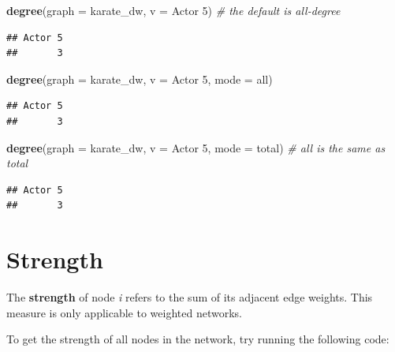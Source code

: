 \documentclass[
]{book}
\newenvironment{Shaded}{\begin{snugshade}}{\end{snugshade}}
\newcommand{\AttributeTok}[1]{\textcolor[rgb]{0.13,0.29,0.53}{#1}}
\newcommand{\CommentTok}[1]{\textcolor[rgb]{0.56,0.35,0.01}{\textit{#1}}}
\newcommand{\FunctionTok}[1]{\textcolor[rgb]{0.13,0.29,0.53}{\textbf{#1}}}
\newcommand{\NormalTok}[1]{#1}
\newcommand{\StringTok}[1]{\textcolor[rgb]{0.31,0.60,0.02}{#1}}
\begin{document}
\begin{Shaded}
\begin{Highlighting}[]
\FunctionTok{degree}\NormalTok{(}\AttributeTok{graph =}\NormalTok{ karate\_dw, }\AttributeTok{v =} \StringTok{\textquotesingle{}Actor 5\textquotesingle{}}\NormalTok{) }\CommentTok{\# the default is all{-}degree}
\end{Highlighting}
\end{Shaded}

\begin{verbatim}
## Actor 5 
##       3
\end{verbatim}

\begin{Shaded}
\begin{Highlighting}[]
\FunctionTok{degree}\NormalTok{(}\AttributeTok{graph =}\NormalTok{ karate\_dw, }\AttributeTok{v =} \StringTok{\textquotesingle{}Actor 5\textquotesingle{}}\NormalTok{, }\AttributeTok{mode =} \StringTok{\textquotesingle{}all\textquotesingle{}}\NormalTok{) }
\end{Highlighting}
\end{Shaded}

\begin{verbatim}
## Actor 5 
##       3
\end{verbatim}

\begin{Shaded}
\begin{Highlighting}[]
\FunctionTok{degree}\NormalTok{(}\AttributeTok{graph =}\NormalTok{ karate\_dw, }\AttributeTok{v =} \StringTok{\textquotesingle{}Actor 5\textquotesingle{}}\NormalTok{, }\AttributeTok{mode =} \StringTok{\textquotesingle{}total\textquotesingle{}}\NormalTok{) }\CommentTok{\# all is the same as total}
\end{Highlighting}
\end{Shaded}

\begin{verbatim}
## Actor 5 
##       3
\end{verbatim}

\section{Strength}\label{strength}

The \textbf{strength} of node \emph{i} refers to the sum of its adjacent edge weights. This measure is only applicable to weighted networks.

To get the strength of all nodes in the network, try running the following code:
\end{document}
